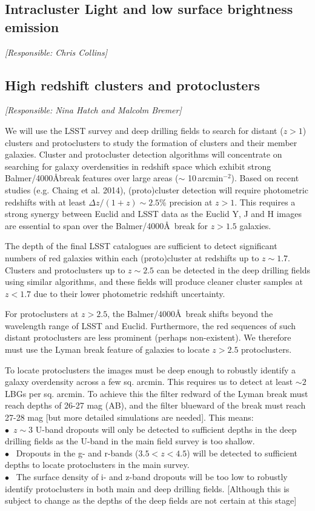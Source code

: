\documentclass[a4paper,11pt]{article}
\begin{document}
\subsection{Intracluster Light and low surface brightness emission}

{\it [Responsible: Chris Collins]}

\subsection{High redshift clusters and protoclusters}

{\it [Responsible: Nina Hatch and Malcolm Bremer]}


\noindent We will use the LSST survey and deep drilling fields to search for distant ($z >1$) clusters and protoclusters to study the formation of clusters and their member galaxies. Cluster and protocluster detection algorithms will concentrate on searching for galaxy overdensities in redshift space which exhibit strong Balmer/4000\AA break features over large areas ($\sim$ 10\,arcmin$^{-2}$). Based on recent studies (e.g. Chaing et al. 2014), (proto)cluster detection will require photometric redshifts with at least $\Delta z/ (1+z)\sim2.5$\% precision at $z>1$. This requires a strong synergy between Euclid and LSST data as the Euclid Y, J and H images are essential to span over the Balmer/4000\AA\ break for $z>1.5$ galaxies.  

The depth of the final LSST catalogues are sufficient to detect significant numbers of red galaxies within each (proto)cluster at redshifts up to $z\sim1.7$. Clusters and protoclusters up to $z\sim2.5$ can be detected in the deep drilling fields using similar algorithms, and these fields  will produce cleaner cluster samples at $z<1.7$ due to their lower photometric redshift uncertainty.

For protoclusters at $z>2.5$, the Balmer/$4000$\AA\ break shifts beyond the wavelength range of LSST and Euclid. Furthermore, the red sequences of such distant protoclusters are less prominent (perhaps non-existent). We therefore must use the Lyman break feature of galaxies to locate $z>2.5$ protoclusters.

To locate protoclusters the images must be deep enough to robustly identify a galaxy overdensity across a few sq. arcmin. This requires us to detect at least $\sim2$ LBGs per sq. arcmin. To achieve this the filter redward of the Lyman break must reach depths of 26-27 mag (AB), and the filter blueward of the break must reach 27-28 mag [but more detailed simulations are needed]. This means:\\
\noindent $\bullet$~$z\sim3$ U-band dropouts will only be detected to sufficient depths in the deep drilling fields as the U-band in the main field survey is too shallow. \\
\noindent $\bullet$ ~Dropouts in the g- and r-bands  ($3.5<z<4.5$) will be detected to sufficient depths to locate protoclusters in the main survey. \\
\noindent $\bullet$ ~The surface density of i- and z-band dropouts will be too low to robustly identify protoclusters in both main and deep drilling fields. [Although this is subject to change as the depths of the deep fields are not certain at this stage]
\end{document}
